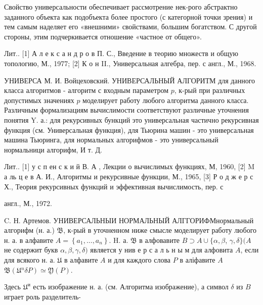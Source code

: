 \documentclass[10pt]{article}
\begin{document}
Свойство универсальности обеспечивает рассмотрение нек-рого абстрактно заданного объекта как подобъекта более простого (с категорной точки зрения) и тем самым наделяет его «внешними» свойствами, большим богатством. С другой стороны, этим подчеркивается отношение «частное от общего».



Лит.. [1] А л е к с а н д р о в П. С., Введение в теорию множеств и общую топологию, М., 1977; [2] К о н II., Универсальная алгебра, пер. с англ., М., 1968.



УНИВЕРСА М. И. Войцеховский. УНИВЕРСАЛЬНЫЙ АЛГОРИТМ для данного класса алгоритмов - алгоритм с входным параметром $p$, к-рый при различных допустимых значениях $p$ моделирует работу любого алгоритма данного класса. Различным формализациям вычислимости соответствуют различные уточнения понятия $\mathrm{Y}$. а.: для рекурсивных бункций это универсальная частично рекурсивная функция (см. Универсальная функция), для Тьюрина машин - это универсальная машина Тьюринга, для нормальных алгорифмов - это универсальный нормальници алгорифм, И т. Д.



Лит.. [1] у с п ен с к и й В. А , Лекции о вычислимых функциях, М, 1960, [2] M а ль ц е в А. И., Алгоритмы и рекурсивные функции, М., 1965, [3] Р о д ж е р с Х., Теория рекурсивных функций и эффективная вычислимость, пер. с

англ., М., 1972.

C. Н. Артемов. УНИВЕРСАЛЬНЫИ НОРМАЛЬНЫЙ АЛГГОРИФМнормальный алгорифм (н. а.) $\mathfrak{B}$, к-рый в уточненном ниже смысле моделирует работу любого н. а. в алфавите $A=\left\{a_{1}, \ldots, a_{n}\right\}$. H. а. $\mathfrak{B}$ в алфовавите $B \supset A \cup\{\alpha, \beta$, $\gamma, \delta\}(A$ не содержит букв $\alpha, \beta, \gamma, \delta)$ является у нив е р с а л ь н ы м для алфовита $A$, если для всякого н. а. $\mathfrak{U}$ в алфавите $A$ и для каждого слова $P$ в аліфавите $A$ $\mathfrak{B}\left(\mathfrak{U}{ }^{n} \delta P\right) \simeq \mathfrak{Y}(P)$.



Здесь $\mathfrak{U}^{и}$ есть изображение н. а. (см. Алгоритма изображение), а символ $\delta$ из $B$ играет роль разделитель-
\end{document}

